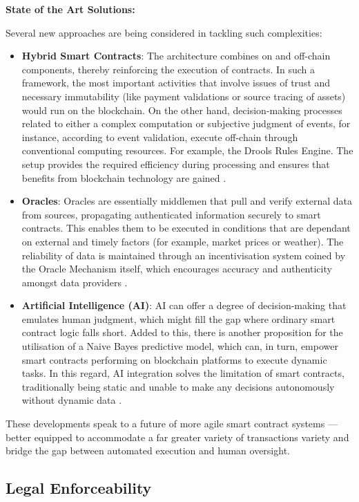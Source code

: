 \textbf{State of the Art Solutions:}

Several new approaches are being considered in tackling such complexities:

\begin{itemize}
    \item \textbf{Hybrid Smart Contracts}:
    The architecture combines on and off-chain components, thereby reinforcing the execution of contracts. In such a framework, the most important activities that involve issues of trust and necessary immutability (like payment validations or source tracing of assets) would run on the blockchain. On the other hand, decision-making processes related to either a complex computation or subjective judgment of events, for instance, according to event validation, execute off-chain through conventional computing resources. For example, the Drools Rules Engine. The setup provides the required efficiency during processing and ensures that benefits from blockchain technology are gained \cite{SolaimanEtAl2021}.
    \item \textbf{Oracles}: Oracles are essentially middlemen that pull and verify external data from sources, propagating authenticated information securely to smart contracts. This enables them to be executed in conditions that are dependant on external and timely factors (for example, market prices or weather). The reliability of data is maintained through an incentivisation system coined by the Oracle Mechanism itself, which encourages accuracy and authenticity amongst data providers \cite{WangEtAl2020}.
    \item \textbf{Artificial Intelligence (AI)}: 
    AI can offer a degree of decision-making that emulates human judgment, which might fill the gap where ordinary smart contract logic falls short. Added to this, there is another proposition for the utilisation of a Naive Bayes predictive model, which can, in turn, empower smart contracts performing on blockchain platforms to execute dynamic tasks. In this regard, AI integration solves the limitation of smart contracts, traditionally being static and unable to make any decisions autonomously without dynamic data \cite{BadruddojaEtAl2021}.
\end{itemize}

These developments speak to a future of more agile smart contract systems — better equipped to accommodate a far greater variety of transactions variety and bridge the gap between automated execution and human oversight.

\subsection{Legal Enforceability}

